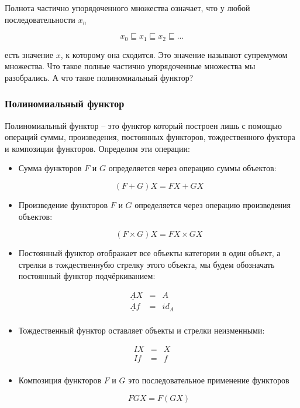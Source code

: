Полнота частично упорядоченного множества означает, что у любой
последовательности $x_n$

\[x_0 \sqsubseteq x_1 \sqsubseteq x_2 \sqsubseteq ...\]

\noindent 

есть значение $x$, к которому она сходится. Это значение называют
супремумом множества. Что такое полные частично упорядоченные множества
мы разобрались. А что такое полиномиальный функтор?

\subsubsection{Полиномиальный функтор}

Полиномиальный функтор -- это функтор который построен лишь с помощью
операций суммы, произведения, постоянных функторов, тождественного
фуктора и композиции функторов. Определим эти операции:

\begin{itemize}
\item
  Сумма функторов $F$ и $G$ определяется через операцию суммы объектов:

  \[(F+G)X = FX + GX\]
\item
  Произведение функторов $F$ и $G$ определяется через операцию
  произведения объектов:

  \[(F\times G)X = FX \times GX\]
\item
  Постоянный функтор отображает все объекты категории в один объект, а
  стрелки в тождественнубю стрелку этого объекта, мы будем обозначать
  постоянный функтор подчёркиванием:
\end{itemize}

\begin{eqnarray*}
    \underline{A}X &=& A \\
    \underline{A}f &=& id_A \\
\end{eqnarray*}

\begin{itemize}
\item
  Тождественный функтор оставляет объекты и стрелки неизменными:
\end{itemize}

\begin{eqnarray*}
    IX &=& X \\
    If &=& f \\
\end{eqnarray*}

\begin{itemize}
\item
  Композиция функторов $F$ и $G$ это последовательное применение
  функторов

  \[FGX = F(GX)\]
\end{itemize}

